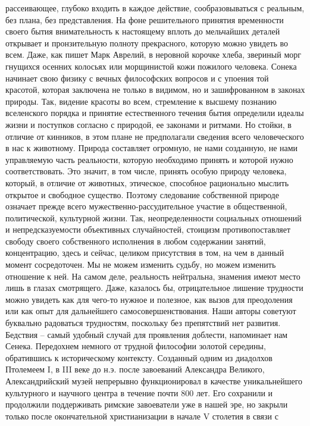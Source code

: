 рассеивающее, глубоко входить в каждое действие, сообразовываться с реальным,
без плана, без представления. На фоне решительного принятия временности своего
бытия внимательность к настоящему вплоть до мельчайших деталей открывает и
пронзительную полноту прекрасного, которую можно увидеть во всем. Даже, как
пишет Марк Аврелий, в неровной корочке хлеба, звериный морг гнущихся осенних
колосьях или морщинистой кожи пожилого человека. Сонека начинает свою физику с
вечных философских вопросов и с упоения той красотой, которая заключена не
только в видимом, но и зашифрованном в законах природы. Так, видение красоты во
всем, стремление к высшему познанию вселенского порядка и принятие естественного
течения бытия определили идеалы жизни и поступков согласно с природой, ее
законами и ритмами. Но стойки, в отличие от кинников, в этом плане не
предполагали сведения всего человеческого в нас к животному. Природа составляет
огромную, не нами созданную, не нами управляемую часть реальности, которую
необходимо принять и которой нужно соответствовать. Это значит, в том числе,
принять особую природу человека, который, в отличие от животных, этическое,
способное рационально мыслить открытое и свободное существо. Поэтому следование
собственной природе означает прежде всего мужественно-рассудительное участие в
общественной, политической, культурной жизни. Так, неопределенности социальных
отношений и непредсказуемости объективных случайностей, стоицизм
противопоставляет свободу своего собственного исполнения в любом содержании
занятий, концентрацию, здесь и сейчас, целиком присутствия в том, на чем в
данный момент сосредоточен. Мы не можем изменить судьбу, но можем изменить
отношение к ней. На самом деле, реальность нейтральна, знамения имеют место лишь
в глазах смотрящего. Даже, казалось бы, отрицательное лишение трудности можно
увидеть как для чего-то нужное и полезное, как вызов для преодоления или как
опыт для дальнейшего самосовершенствования. Наши авторы советуют буквально
радоваться трудностям, поскольку без препятствий нет развития. Бедствия – самый
удобный случай для проявления доблести, напоминает нам Сенека. Передохнем
немного от трудной философии золотой середины, обратившись к историческому
контексту. Созданный одним из диадолхов Птолемеем I, в III веке до н.э. после
завоеваний Александра Великого, Александрийский музей непрерывно функционировал
в качестве уникальнейшего культурного и научного центра в течение почти 800 лет.
Его сохранили и продолжили поддерживать римские завоеватели уже в нашей эре, но
закрыли только после окончательной христианизации в начале V столетия в связи с

